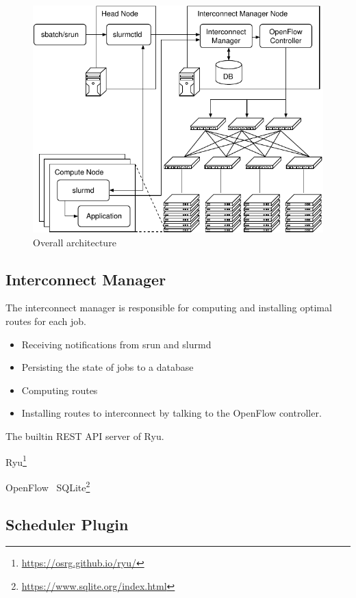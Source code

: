 \documentclass[graybox]{svmult}
\begin{document}
\begin{figure}
    \centering
    \includegraphics{architecture}
    \caption{Overall architecture}%
    \label{kt:fig:architecture}
\end{figure}

\subsection{Interconnect Manager}

The interconnect manager is responsible for computing and installing optimal
routes for each job.

\begin{itemize}
    \item Receiving notifications from srun and slurmd
    \item Persisting the state of jobs to a database
    \item Computing routes
    \item Installing routes to interconnect by talking to the OpenFlow
        controller.
\end{itemize}


The builtin REST API server of Ryu.

Ryu\footnote{\url{https://osrg.github.io/ryu/}}

OpenFlow~\cite{McKeown2008}
SQLite\footnote{\url{https://www.sqlite.org/index.html}}

\subsection{Scheduler Plugin}
\end{document}
